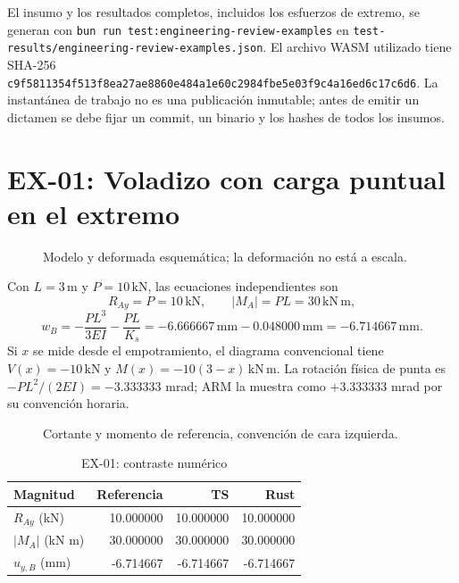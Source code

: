 \documentclass[11pt,a4paper]{article}
\newcommand{\kN}{\,\mathrm{kN}}
\newcommand{\kNm}{\,\mathrm{kN\,m}}
\newcommand{\mm}{\,\mathrm{mm}}
\newcommand{\m}{\,\mathrm{m}}
\newcommand{\caseheading}[2]{\section{#1: #2}}
\begin{document}
El insumo y los resultados completos, incluidos los esfuerzos de extremo,
se generan con \texttt{bun run test:engineering-review-examples} en
\texttt{test-results/engineering-review-examples.json}. El archivo WASM
utilizado tiene SHA-256
\texttt{c9f5811354f513f8ea27ae8860e484a1e60c2984fbe5e03f9c4a16ed6c17c6d6}.
La instantánea de trabajo no es una publicación inmutable; antes de emitir
un dictamen se debe fijar un commit, un binario y los hashes de todos los
insumos.

\caseheading{EX-01}{Voladizo con carga puntual en el extremo}
\begin{figure}[H]\centering
{}
\caption{Modelo y deformada esquemática; la deformación no está a escala.}
\end{figure}
Con $L=3\m$ y $P=10\kN$, las ecuaciones independientes son
\[
R_{Ay}=P=10\kN,\qquad |M_A|=PL=30\kNm,
\]
\[
w_B=-\frac{PL^3}{3EI}-\frac{PL}{K_s}
=-6.666667\mm-0.048000\mm=-6.714667\mm.
\]
Si $x$ se mide desde el empotramiento, el diagrama convencional tiene
$V(x)=-10\kN$ y $M(x)=-10(3-x)\kNm$. La rotación física de punta
es $-PL^2/(2EI)=-3.333333$ mrad; ARM la muestra como
$+3.333333$ mrad por su convención horaria.
\begin{figure}[H]\centering
{}
\caption{Cortante y momento de referencia, convención de cara izquierda.}
\end{figure}
\begin{table}[H]\centering
\caption{EX-01: contraste numérico}
\begin{tabular}{@{}lrrr@{}}\toprule
Magnitud & Referencia & TS & Rust\\\midrule
$R_{Ay}$ (kN) & 10.000000 & 10.000000 & 10.000000\\
$|M_A|$ (kN m) & 30.000000 & 30.000000 & 30.000000\\
$u_{y,B}$ (mm) & -6.714667 & -6.714667 & -6.714667\\
\bottomrule\end{tabular}
\end{table}
\end{document}
